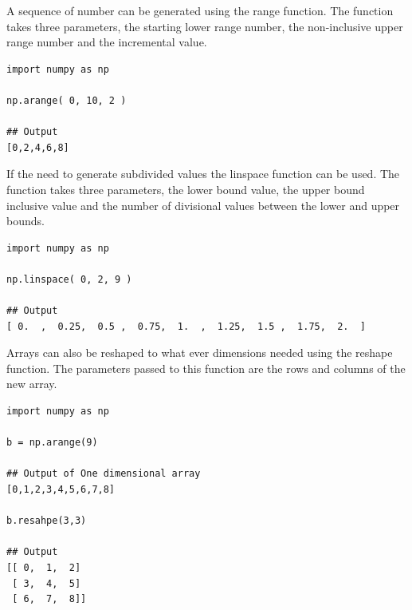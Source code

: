 A sequence of number can be generated using  the range function. The function takes three parameters,  the starting lower range number, the non-inclusive upper range number and the incremental value.
\begin{verbatim}
import numpy as np

np.arange( 0, 10, 2 )

## Output
[0,2,4,6,8]
\end{verbatim}
If the need to generate subdivided values the linspace function can be used. The function takes three parameters, the lower bound value, the upper bound inclusive value and the number of divisional values between the lower and upper bounds.
\begin{verbatim}
import numpy as np

np.linspace( 0, 2, 9 ) 

## Output
[ 0.  ,  0.25,  0.5 ,  0.75,  1.  ,  1.25,  1.5 ,  1.75,  2.  ]
\end{verbatim}
Arrays can also be reshaped to what ever dimensions needed using the reshape function. The parameters passed to this function are the rows and columns of the new array.
\begin{verbatim}
import numpy as np

b = np.arange(9)

## Output of One dimensional array
[0,1,2,3,4,5,6,7,8]

b.resahpe(3,3)

## Output
[[ 0,  1,  2]
 [ 3,  4,  5]
 [ 6,  7,  8]]
\end{verbatim}
